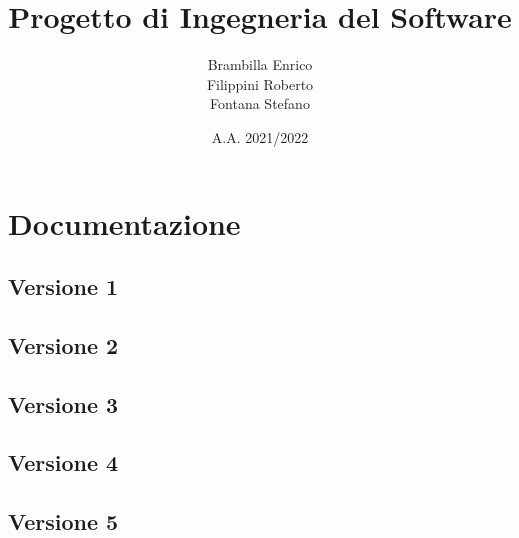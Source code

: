 \documentclass[12pt, a4paper, oneside]{book}
\title{Progetto di Ingegneria del Software}
\author{Brambilla Enrico\\Filippini Roberto\\Fontana Stefano}
\date{A.A. 2021/2022}
\begin{document}
\maketitle
\cleardoublepage
{}
\tableofcontents
\cleardoublepage






\chapter{Documentazione}
\section{Versione 1}


\pagebreak
\section{Versione 2}


\pagebreak
\section{Versione 3}


\pagebreak
\section{Versione 4}


\pagebreak
\section{Versione 5}


\cleardoublepage
{}
\listoffigures
\end{document}
